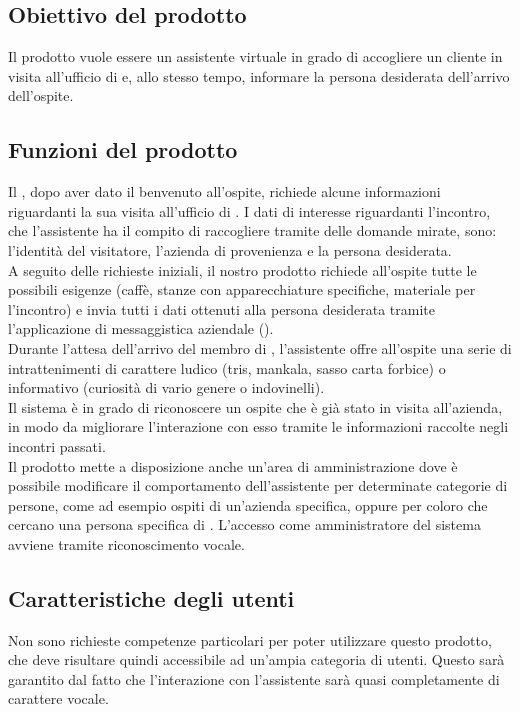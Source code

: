 \subsection{Obiettivo del prodotto}
Il prodotto vuole essere un assistente virtuale in grado di accogliere un cliente in visita all'ufficio di \PROPONENTE{} e, allo stesso tempo, informare la persona desiderata dell'arrivo dell'ospite. 
\subsection{Funzioni del prodotto}
Il , dopo aver dato il benvenuto all'ospite, richiede alcune informazioni riguardanti la sua visita all'ufficio di \PROPONENTE. I dati di interesse riguardanti l'incontro, che l'assistente ha il compito di raccogliere tramite delle domande mirate, sono: l'identità del visitatore, l'azienda di provenienza e la persona desiderata.\\
A seguito delle richieste iniziali, il nostro prodotto richiede all'ospite tutte le possibili esigenze (caffè, stanze con apparecchiature specifiche, materiale per l'incontro) e invia tutti i dati ottenuti alla persona desiderata tramite l'applicazione di messaggistica aziendale ().\\
Durante l'attesa dell'arrivo del membro di \PROPONENTE{}, l'assistente offre all'ospite una serie di intrattenimenti di carattere ludico (tris, mankala, sasso carta forbice) o informativo (curiosità di vario genere o indovinelli).\\
Il sistema è in grado di riconoscere un ospite che è già stato in visita all'azienda, in modo da migliorare l'interazione con esso tramite le informazioni raccolte negli incontri passati. \\
Il prodotto mette a disposizione anche un'area di amministrazione dove è possibile modificare il comportamento dell'assistente per determinate categorie di persone, come ad esempio ospiti di un'azienda specifica, oppure per coloro che cercano una persona specifica di \PROPONENTE{}. L'accesso come amministratore del sistema avviene tramite riconoscimento vocale.  
\subsection{Caratteristiche degli utenti}
Non sono richieste competenze particolari per poter utilizzare questo prodotto, che deve risultare
quindi accessibile ad un'ampia categoria di utenti. Questo sarà garantito dal fatto che l'interazione con l'assistente sarà quasi completamente di carattere vocale.
